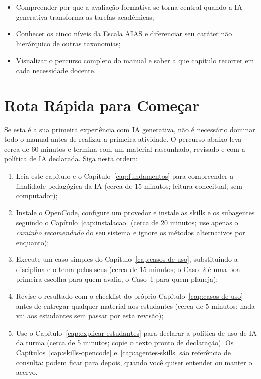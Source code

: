 \begin{objetivos}
\begin{itemize}
  \item Compreender por que a avalia{\c c}{\~a}o formativa se torna central quando a IA generativa transforma as tarefas acad{\^e}micas;
  \item Conhecer os cinco n{\'i}veis da Escala AIAS e diferenciar seu car{\'a}ter n{\~a}o hier{\'a}rquico de outras taxonomias;
  \item Visualizar o percurso completo do manual e saber a que cap{\'i}tulo recorrer em cada necessidade docente.
\end{itemize}
\end{objetivos}

\section{Rota R{\'a}pida para Come{\c c}ar}

Se esta {\'e} a sua primeira experi{\^e}ncia com IA generativa, n{\~a}o {\'e} necess{\'a}rio dominar todo o manual antes de realizar a primeira atividade. O percurso abaixo leva cerca de 60 minutos e termina com um material rascunhado, revisado e com a pol{\'i}tica de IA declarada. Siga nesta ordem:

\begin{enumerate}
  \item Leia este cap{\'i}tulo e o Cap{\'i}tulo~\ref{cap:fundamentos} para compreender a finalidade pedag{\'o}gica da IA (cerca de 15 minutos; leitura conceitual, sem computador);
  \item Instale o OpenCode, configure um provedor e instale as skills e os subagentes seguindo o Cap{\'i}tulo~\ref{cap:instalacao} (cerca de 20 minutos; use apenas o \emph{caminho recomendado} do seu sistema e ignore os m{\'e}todos alternativos por enquanto);
  \item Execute um caso simples do Cap{\'i}tulo~\ref{cap:casos-de-uso}, substituindo a disciplina e o tema pelos seus (cerca de 15 minutos; o Caso~2 {\'e} uma boa primeira escolha para quem avalia, o Caso~1 para quem planeja);
  \item Revise o resultado com o checklist do pr{\'o}prio Cap{\'i}tulo~\ref{cap:casos-de-uso} antes de entregar qualquer material aos estudantes (cerca de 5 minutos; nada vai aos estudantes sem passar por esta revis{\~a}o);
  \item Use o Cap{\'i}tulo~\ref{cap:explicar-estudantes} para declarar a pol{\'i}tica de uso de IA da turma (cerca de 5 minutos; copie o texto pronto de declara{\c c}{\~a}o). Os Cap{\'i}tulos~\ref{cap:skills-opencode} e~\ref{cap:agentes-skills} s{\~a}o refer{\^e}ncia de consulta: podem ficar para depois, quando voc{\^e} quiser entender ou manter o acervo.
\end{enumerate}


